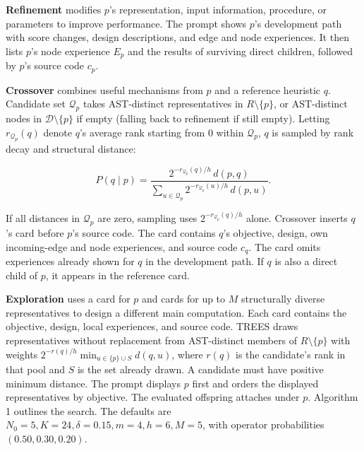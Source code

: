 \documentclass{article}
\begin{document}
\textbf{Refinement} modifies \(p\)'s representation, input information, procedure, or parameters to improve performance. The prompt shows \(p\)'s development path with score changes, design descriptions, and edge and node experiences. It then lists \(p\)'s node experience \(E_p\) and the results of surviving direct children, followed by \(p\)'s source code \(c_p\).

\textbf{Crossover} combines useful mechanisms from \(p\) and a reference heuristic \(q\). Candidate set \(\mathcal Q_p\) takes AST-distinct representatives in \(R\setminus\{p\}\), or AST-distinct nodes in \(\mathcal D\setminus\{p\}\) if empty (falling back to refinement if still empty). Letting \(r_{\mathcal Q_p}(q)\) denote \(q\)'s average rank starting from \(0\) within \(\mathcal Q_p\), \(q\) is sampled by rank decay and structural distance:

\[
P(q\mid p) = \frac{2^{-r_{\mathcal Q_p}(q)/h}\,d(p,q)}{\sum_{u\in\mathcal Q_p}2^{-r_{\mathcal Q_p}(u)/h}\,d(p,u)}.
\tag{5}
\]

If all distances in \(\mathcal Q_p\) are zero, sampling uses \(2^{-r_{\mathcal Q_p}(q)/h}\) alone. Crossover inserts \(q\)'s card before \(p\)'s source code. The card contains \(q\)'s objective, design, own incoming-edge and node experiences, and source code \(c_q\). The card omits experiences already shown for \(q\) in the development path. If \(q\) is also a direct child of \(p\), it appears in the reference card.

\textbf{Exploration} uses a card for \(p\) and cards for up to \(M\) structurally diverse representatives to design a different main computation. Each card contains the objective, design, local experiences, and source code. TREES draws representatives without replacement from AST-distinct members of \(R\setminus\{p\}\) with weights \(2^{-r(q)/h}\min_{u\in\{p\}\cup S}d(q,u)\), where \(r(q)\) is the candidate's rank in that pool and \(S\) is the set already drawn. A candidate must have positive minimum distance. The prompt displays \(p\) first and orders the displayed representatives by objective. The evaluated offspring attaches under \(p\). Algorithm 1 outlines the search. The defaults are \(N_0=5,K=24,\delta=0.15,m=4,h=6,M=5\), with operator probabilities \((0.50,0.30,0.20)\).
\end{document}
